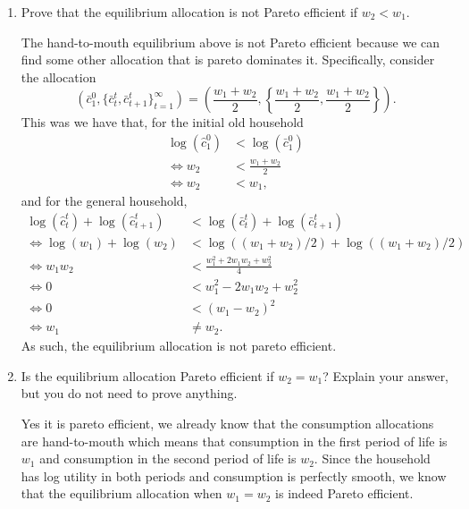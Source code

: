 \documentclass[11pt,english]{article}
\begin{document}
\begin{enumerate}
    \item[e.] Prove that the equilibrium allocation is not Pareto efficient if
        $w_2 < w_1$.
    \begin{solution}
The hand-to-mouth equilibrium above is not Pareto efficient because we can find some other allocation that is pareto dominates it. Specifically, consider the allocation $$\left(\bar{c}_1^0, \{\bar{c}_t^t, \bar{c}_{t+1}^t\}_{t=1}^\infty\right) = \left(\frac{w_1 + w_2}{2}, \left\{\frac{w_1 + w_2}{2}, \frac{w_1 + w_2}{2}\right\}\right).$$ This was we have that, for the initial old household
\begin{align*}
\log(\hat{c}_1^0) &< \log(\bar{c}_1^0)\\
\Longleftrightarrow w_2 &< \frac{w_1 + w_2}{2}\\
\Longleftrightarrow w_2 &< w_1,
\end{align*}
and for the general household,
\begin{align*}
\log(\hat{c}_t^t) + \log(\hat{c}_{t+1}^t)&< \log(\bar{c}_t^t) + \log(\bar{c}_{t+1}^t)\\
\Longleftrightarrow \log(w_1) + \log(w_2)&< \log((w_1 + w_2)/2) + \log((w_1 + w_2)/2)\\
\Longleftrightarrow w_1w_2 &< \frac{w_1^2 + 2w_1w_2 + w_2^2}{4}\\
\Longleftrightarrow 0 &< w_1^2 - 2w_1w_2 + w_2^2\\
\Longleftrightarrow 0 &< (w_1 - w_2)^2\\
\Longleftrightarrow w_1 &\neq w_2.
\end{align*} As such, the equilibrium allocation is not pareto efficient.
    \end{solution}
 
    \item[f.] Is the equilibrium allocation Pareto efficient if $w_2 = w_1$?
        Explain your answer, but you do not need to prove anything.
    \begin{solution}
 Yes it is pareto efficient, we already know that the consumption allocations are hand-to-mouth which means that consumption in the first period of life is $w_1$ and consumption in the second period of life is $w_2$. Since the household has log utility in both periods and consumption is perfectly smooth, we know that the equilibrium allocation when $w_1 = w_2$ is indeed Pareto efficient.
    \end{solution}
\end{enumerate}
\end{document}

